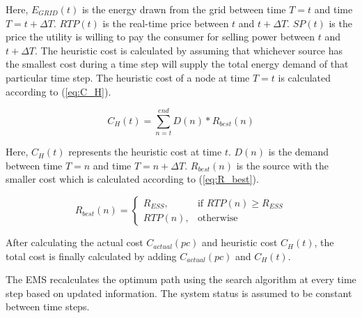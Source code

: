 Here, $E_{GRID}(t)$ is the energy drawn from the grid between time $T=t$ and time $T=t+\Delta T$. $RTP(t)$ is the real-time price between $t$ and $t+\Delta T$. $SP(t)$ is the price the utility is willing to pay the consumer for selling power between $t$ and $t+\Delta T$. The heuristic cost is calculated by assuming that whichever source has the smallest cost during a time step will supply the total energy demand of that particular time step. The heuristic cost of a node at time $T = t$ is calculated according to (\ref{eq:C_H}).

\begin{equation}
\label{eq:C_H}
C_H(t) = \sum_{n=t}^{end} D(n)*R_{best}(n)
\end{equation}

Here, $C_H(t)$ represents the heuristic cost at time $t$. $D(n)$ is the demand between time $T = n$ and time $T = n+\Delta T$. $R_{best}(n)$ is the source with the smaller cost which is calculated according to (\ref{eq:R_best}).

\begin{equation}
\label{eq:R_best}
R_{best}(n) = 
\begin{cases}
    R_{ESS},& \text{if } RTP(n)\geq R_{ESS}\\
    RTP(n),              & \text{otherwise}
\end{cases}
\end{equation}

After calculating the actual cost  $C_{actual}(pc)$ and heuristic cost $C_H(t)$, the total cost is finally calculated by adding  $C_{actual}(pc)$ and $C_H(t)$.

The EMS recalculates the optimum path using the search algorithm at every time step based on updated information. The system status is assumed to be constant between time steps. 